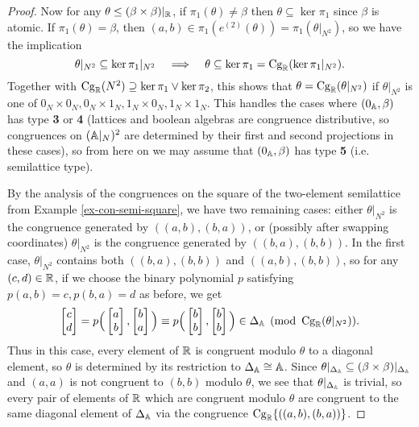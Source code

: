 \begin{appendices}
\begin{proof}
Now for any $\theta \le (\beta \times \beta)|_{\mathbb{R}}$, if $\pi_1(\theta) \ne \beta$ then $\theta \subseteq \ker \pi_1$ since $\beta$ is atomic. If $\pi_1(\theta) = \beta$, then $(a,b) \in \pi_1(e^{(2)}(\theta)) = \pi_1(\theta|_{N^2})$, so we have the implication
\[
\theta|_{N^2} \subseteq \ker \pi_1|_{N^2} \;\;\; \implies \;\;\; \theta \subseteq \ker \pi_1 = \operatorname{Cg}_{\mathbb{R}}(\ker \pi_1|_{N^2}).
\]
Together with $\operatorname{Cg}_{\mathbb{R}}(N^2) \supseteq \ker \pi_1 \vee \ker \pi_2$, this shows that $\theta = \operatorname{Cg}_{\mathbb{R}}(\theta|_{N^2})$ if $\theta|_{N^2}$ is one of $0_N \times 0_N, 0_N \times 1_N, 1_N \times 0_N, 1_N\times 1_N$. This handles the cases where $(0_{\mathbb{A}}, \beta)$ has type \textbf{3} or \textbf{4} (lattices and boolean algebras are congruence distributive, so congruences on $(\mathbb{A}|_N)^2$ are determined by their first and second projections in these cases), so from here on we may assume that $(0_{\mathbb{A}}, \beta)$ has type \textbf{5} (i.e. semilattice type).

By the analysis of the congruences on the square of the two-element semilattice from Example \ref{ex-con-semi-square}, we have two remaining cases: either $\theta|_{N^2}$ is the congruence generated by $((a,b), (b,a))$, or (possibly after swapping coordinates) $\theta|_{N^2}$ is the congruence generated by $((b,a),(b,b))$. In the first case, $\theta|_{N^2}$ contains both $((b,a),(b,b))$ and $((a,b),(b,b))$, so for any $(c,d) \in \mathbb{R}$, if we choose the binary polynomial $p$ satisfying $p(a,b) = c, p(b,a) = d$ as before, we get
\[
\begin{bmatrix} c\\ d\end{bmatrix} = p\Big(\begin{bmatrix} a\\ b\end{bmatrix}, \begin{bmatrix} b\\ a\end{bmatrix}\Big) \equiv p\Big(\begin{bmatrix} b\\ b\end{bmatrix}, \begin{bmatrix} b\\ b\end{bmatrix}\Big) \in \Delta_{\mathbb{A}} \pmod{\operatorname{Cg}_{\mathbb{R}}(\theta|_{N^2})}.
\]
Thus in this case, every element of $\mathbb{R}$ is congruent modulo $\theta$ to a diagonal element, so $\theta$ is determined by its restriction to $\Delta_{\mathbb{A}} \cong \mathbb{A}$. Since $\theta|_{\Delta_{\mathbb{A}}} \subseteq (\beta \times \beta)|_{\Delta_{\mathbb{A}}}$ and $(a,a)$ is not congruent to $(b,b)$ modulo $\theta$, we see that $\theta|_{\Delta_{\mathbb{A}}}$ is trivial, so every pair of elements of $\mathbb{R}$ which are congruent modulo $\theta$ are congruent to the same diagonal element of $\Delta_{\mathbb{A}}$ via the congruence $\operatorname{Cg}_{\mathbb{R}}\{((a,b),(b,a))\}$.


\end{proof}
\end{appendices}
